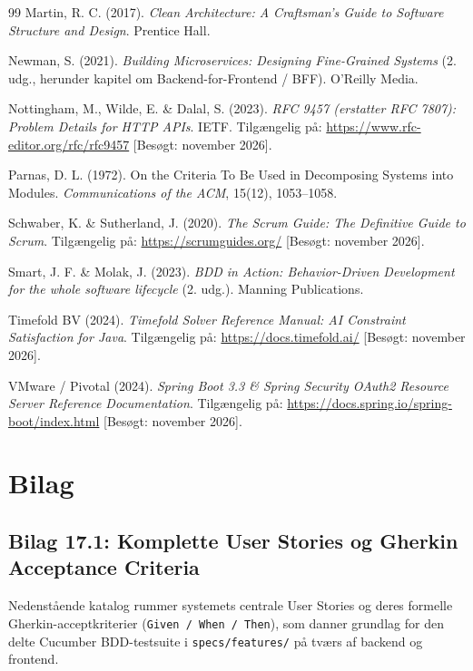 \documentclass[11pt,a4paper]{article}
\begin{document}
\begin{thebibliography}{99}
Martin, R. C. (2017). \textit{Clean Architecture: A Craftsman's Guide to Software Structure and Design}. Prentice Hall.

Newman, S. (2021). \textit{Building Microservices: Designing Fine-Grained Systems} (2. udg., herunder kapitel om Backend-for-Frontend / BFF). O'Reilly Media.

Nottingham, M., Wilde, E. \& Dalal, S. (2023). \textit{RFC 9457 (erstatter RFC 7807): Problem Details for HTTP APIs}. IETF. Tilgængelig på: \url{https://www.rfc-editor.org/rfc/rfc9457} [Besøgt: november 2026].

Parnas, D. L. (1972). On the Criteria To Be Used in Decomposing Systems into Modules. \textit{Communications of the ACM}, 15(12), 1053--1058.

Schwaber, K. \& Sutherland, J. (2020). \textit{The Scrum Guide: The Definitive Guide to Scrum}. Tilgængelig på: \url{https://scrumguides.org/} [Besøgt: november 2026].

Smart, J. F. \& Molak, J. (2023). \textit{BDD in Action: Behavior-Driven Development for the whole software lifecycle} (2. udg.). Manning Publications.

Timefold BV (2024). \textit{Timefold Solver Reference Manual: AI Constraint Satisfaction for Java}. Tilgængelig på: \url{https://docs.timefold.ai/} [Besøgt: november 2026].

VMware / Pivotal (2024). \textit{Spring Boot 3.3 \& Spring Security OAuth2 Resource Server Reference Documentation}. Tilgængelig på: \url{https://docs.spring.io/spring-boot/index.html} [Besøgt: november 2026].

\end{thebibliography}

\newpage
\section{Bilag}

\subsection{Bilag 17.1: Komplette User Stories og Gherkin Acceptance Criteria}
Nedenstående katalog rummer systemets centrale User Stories og deres formelle Gherkin-acceptkriterier (\texttt{Given / When / Then}), som danner grundlag for den delte Cucumber BDD-testsuite i \texttt{specs/features/} på tværs af backend og frontend.
\end{document}
